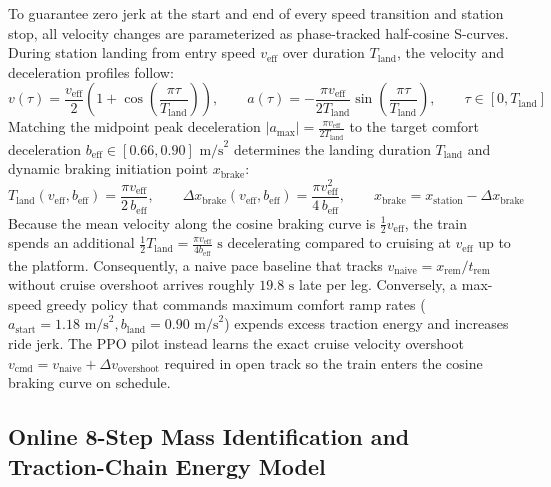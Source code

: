 \documentclass[10pt,a4paper]{article}
\begin{document}
To guarantee zero jerk at the start and end of every speed transition and station stop, all velocity changes are parameterized as phase-tracked half-cosine S-curves. During station landing from entry speed $v_{\text{eff}}$ over duration $T_{\text{land}}$, the velocity and deceleration profiles follow:
\begin{equation}
    v(\tau) = \frac{v_{\text{eff}}}{2}\left(1 + \cos\!\left(\frac{\pi \tau}{T_{\text{land}}}\right)\right), \qquad
    a(\tau) = -\frac{\pi v_{\text{eff}}}{2 T_{\text{land}}}\sin\!\left(\frac{\pi \tau}{T_{\text{land}}}\right), \qquad \tau \in [0, T_{\text{land}}]
    \label{eq:cosine_land}
\end{equation}
Matching the midpoint peak deceleration $|a_{\max}| = \frac{\pi v_{\text{eff}}}{2 T_{\text{land}}}$ to the target comfort deceleration $b_{\text{eff}} \in [0.66, 0.90]\text{ m/s}^2$ determines the landing duration $T_{\text{land}}$ and dynamic braking initiation point $x_{\text{brake}}$:
\begin{equation}
    T_{\text{land}}(v_{\text{eff}}, b_{\text{eff}}) = \frac{\pi v_{\text{eff}}}{2\,b_{\text{eff}}}, \qquad
    \Delta x_{\text{brake}}(v_{\text{eff}}, b_{\text{eff}}) = \frac{\pi v_{\text{eff}}^2}{4\,b_{\text{eff}}}, \qquad
    x_{\text{brake}} = x_{\text{station}} - \Delta x_{\text{brake}}
    \label{eq:braking_spot}
\end{equation}
Because the mean velocity along the cosine braking curve is $\frac{1}{2}v_{\text{eff}}$, the train spends an additional $\frac{1}{2}T_{\text{land}} = \frac{\pi v_{\text{eff}}}{4 b_{\text{eff}}}\text{ s}$ decelerating compared to cruising at $v_{\text{eff}}$ up to the platform. Consequently, a naive pace baseline that tracks $v_{\text{naive}} = x_{\text{rem}} / t_{\text{rem}}$ without cruise overshoot arrives roughly $19.8\text{ s}$ late per leg. Conversely, a max-speed greedy policy that commands maximum comfort ramp rates ($a_{\text{start}} = 1.18\text{ m/s}^2, b_{\text{land}} = 0.90\text{ m/s}^2$) expends excess traction energy and increases ride jerk. The PPO pilot instead learns the exact cruise velocity overshoot $v_{\text{cmd}} = v_{\text{naive}} + \Delta v_{\text{overshoot}}$ required in open track so the train enters the cosine braking curve on schedule.

\subsection{Online 8-Step Mass Identification and Traction-Chain Energy Model}
\end{document}
